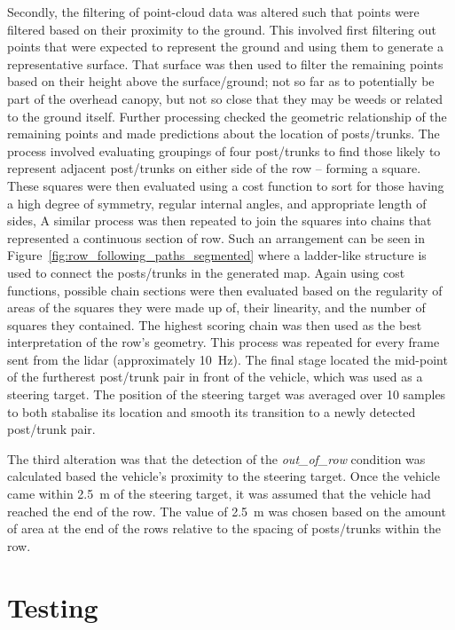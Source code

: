 \documentclass[preprint,authoryear,12pt]{elsarticle}
\begin{document}
      Secondly, the filtering of point-cloud data was altered such that points were filtered based on their proximity to the ground.
      This involved first filtering out points that were expected to represent the ground and using them to generate a representative surface.
      That surface was then used to filter the remaining points based on their height above the surface/ground; not so far as to potentially be part of the overhead canopy, but not so close that they may be weeds or related to the ground itself.
      Further processing checked the geometric relationship of the remaining points and made predictions about the location of posts/trunks.
      The process involved evaluating groupings of four post/trunks to find those likely to represent adjacent post/trunks on either side of the row -- forming a square.
      These squares were then evaluated using a cost function to sort for those having a high degree of symmetry, regular internal angles, and appropriate length of sides,
      A similar process was then repeated to join the squares into chains that represented a continuous section of row.
      Such an arrangement can be seen in Figure~\ref{fig:row_following_paths_segmented} where a ladder-like structure is used to connect the posts/trunks in the generated map.
      Again using cost functions, possible chain sections were then evaluated based on the regularity of areas of the squares they were made up of, their linearity, and the number of squares they contained.
      The highest scoring chain was then used as the best interpretation of the row's geometry.
      This process was repeated for every frame sent from the lidar (approximately \SI{10}{\hertz}).
      The final stage located the mid-point of the furtherest post/trunk pair in front of the vehicle, which was used as a steering target.
      The position of the steering target was averaged over 10 samples to both stabalise its location and smooth its transition to a newly detected post/trunk pair.

      The third alteration was that the detection of the \textit{out\_of\_row} condition was calculated based the vehicle's proximity to the steering target.
      Once the vehicle came within \SI{2.5}{\meter} of the steering target, it was assumed that the vehicle had reached the end of the row.
      The value of \SI{2.5}{\meter} was chosen based on the amount of area at the end of the rows relative to the spacing of posts/trunks within the row.
\section{Testing}
\label{sub:testing}
\end{document}
